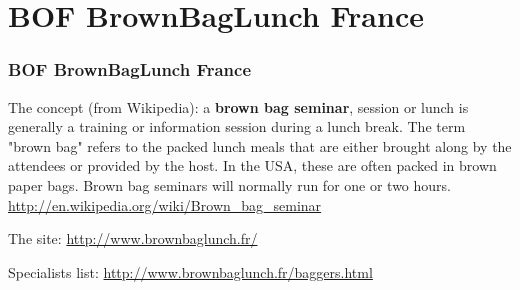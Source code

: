 \documentclass[presentation]{beamer}
\begin{document}
\section{BOF BrownBagLunch France}

\begin{frame}
\frametitle{BOF BrownBagLunch France}

The concept (from Wikipedia):
a \textbf{brown bag seminar}, session or lunch is generally a training or information session during a lunch break. The term "brown bag" refers to the packed lunch meals that are either brought along by the attendees or provided by the host. In the USA, these are often packed in brown paper bags. Brown bag seminars will normally run for one or two hours.
\url{http://en.wikipedia.org/wiki/Brown_bag_seminar}

\vskip5pt
The site:
\url{http://www.brownbaglunch.fr/}

\vskip5pt
Specialists list:
\url{http://www.brownbaglunch.fr/baggers.html}

\end{frame}
\end{document}
